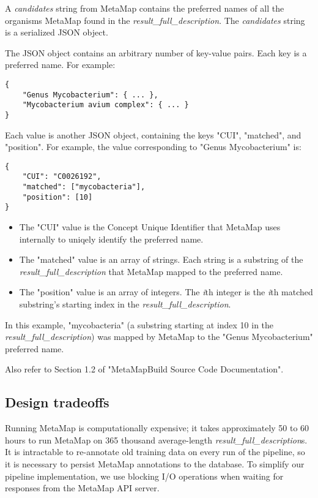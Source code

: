 \documentclass[a4paper]{article}
\begin{document}
A \textit{candidates} string from MetaMap contains the preferred names of all the organisms MetaMap found in the \textit{result\_full\_description}. The \textit{candidates} string is a serialized JSON object.

The JSON object contains an arbitrary number of key-value pairs. Each key is a preferred name. For example:

\lstset{language=}
\begin{lstlisting}
{
    "Genus Mycobacterium": { ... },
    "Mycobacterium avium complex": { ... }
}
\end{lstlisting}
\lstset{language=}

Each value is another JSON object, containing the keys "CUI", "matched", and "position". For example, the value corresponding to "Genus Mycobacterium" is:

\lstset{language=}
\begin{lstlisting}
{
    "CUI": "C0026192",
    "matched": ["mycobacteria"],
    "position": [10]
}
\end{lstlisting}
\lstset{language=}

\begin{itemize}
\item The "CUI" value is the Concept Unique Identifier that MetaMap uses internally to uniqely identify the preferred name.
\item The "matched" value is an array of strings. Each string is a substring of the \textit{result\_full\_description} that MetaMap mapped to the preferred name.
\item The "position" value is an array of integers. The \textit{i}th integer is the \textit{i}th matched substring's starting index in the \textit{result\_full\_description}.
\end{itemize}

In this example, "mycobacteria" (a substring starting at index 10 in the \textit{result\_full\_description}) was mapped by MetaMap to the "Genus Mycobacterium" preferred name.

Also refer to Section 1.2 of "MetaMapBuild Source Code Documentation".

\subsection{Design tradeoffs}

Running MetaMap is computationally expensive; it takes approximately 50 to 60 hours to run MetaMap on 365 thousand average-length \textit{result\_full\_description}s. It is intractable to re-annotate old training data on every run of the pipeline, so it is necessary to persist MetaMap annotations to the database. To simplify our pipeline implementation, we use blocking I/O operations when waiting for responses from the MetaMap API server.
\end{document}
